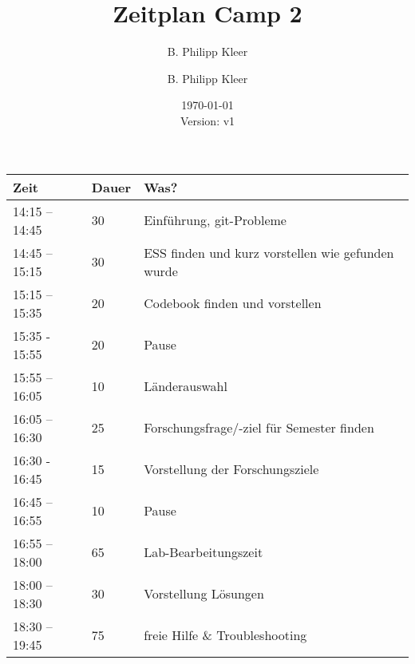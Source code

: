 \documentclass[11pt,a4paper]{article}
\author{B. Philipp Kleer}
\title{%
  Zeitplan Camp 2 \\
  }
\author{B. Philipp Kleer}
\date{\today \\ \small{Version: v1}}
\begin{document}
\maketitle

\center
\begin{longtable}{p{} p{} p{}}
	\toprule[2pt]
	\textbf{Zeit} & \textbf{Dauer} & \textbf{Was?}\\
	\midrule
	14:15 – 14:45 & 30 & Einführung, git-Probleme\\
	\midrule
	14:45 – 15:15 & 30 & ESS finden und kurz vorstellen wie gefunden wurde\\
	\midrule
	15:15 – 15:35& 20 & Codebook finden und vorstellen\\
	\midrule[2pt]
	15:35 - 15:55 & 20 & Pause \\
	\midrule[2pt]
	15:55 – 16:05 & 10 & Länderauswahl\\
	\midrule
	16:05 – 16:30 & 25 & Forschungsfrage/-ziel für Semester finden\\
	\midrule
	16:30 - 16:45 & 15 & Vorstellung der Forschungsziele\\
	\midrule
	16:45 – 16:55 & 10 & Pause\\
	\midrule
	16:55 – 18:00 & 65 & Lab-Bearbeitungszeit\\
	\midrule
	18:00 – 18:30 & 30 & Vorstellung Lösungen\\
	\midrule
	18:30 – 19:45 & 75 & freie Hilfe \& Troubleshooting\\	
	\bottomrule[2pt]
\end{longtable}
\end{document}
